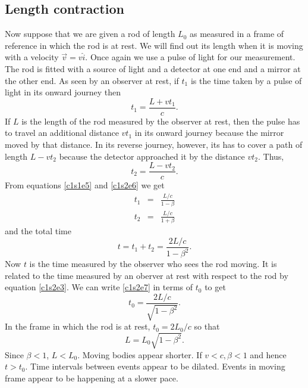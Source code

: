 \subsection{Length contraction}
Now suppose that we are given a rod of length $L_0$ as measured in a frame of
reference in which the rod is at rest. We will find out its length when it is
moving with a velocity $\vec{v} = v\hat{i}$. Once again we use a pulse of light
for our measurement. The rod is fitted with a source of light and a detector
at one end and a mirror at the other end. As seen by an observer at rest,
if $t_1$ is the time taken by a pulse of light in its onward journey then
\begin{equation}\label{c1s2e5}
t_1 = \frac{L + vt_1}{c}.
\end{equation}
If $L$ is the length of the rod measured by the observer at rest, then the pulse
has to travel an additional distance $vt_1$ in its onward journey because the
mirror moved by that distance. In its reverse journey, however, its has to
cover a path of length $L - vt_2$ because the detector approached it by the
distance $vt_2$. Thus,
\begin{equation}\label{c1s2e6}
t_2 = \frac{L - vt_2}{c}.
\end{equation}
From equations \eqref{c1s1e5} and \eqref{c1s2e6} we get
\begin{eqnarray*}
t_1 &=& \frac{L/c}{1 - \beta} \\
t_2 &=& \frac{L/c}{1 + \beta}
\end{eqnarray*}
and the total time 
\begin{equation}\label{c1s2e7}
t = t_1 + t_2 = \frac{2L/c}{1 - \beta^2}.
\end{equation}
Now $t$ is the time measured by the observer who sees the rod moving. It is 
related to the time measured by an oberver at rest with respect to the rod by
equation \eqref{c1s2e3}. We can write \eqref{c1s2e7} in terms of $t_0$ to get
\begin{equation}\label{c1s2e8}
t_0 = \frac{2L/c}{\sqrt{1 - \beta^2}}.
\end{equation}
In the frame in which the rod is at rest, $t_0 = 2L_0/c$ so that
\begin{equation}\label{c1s2e9}
L = L_0\sqrt{1 - \beta^2}.
\end{equation}
Since $\beta < 1$, $L < L_0$. Moving bodies appear shorter.
If $v < c, \beta < 1$ and hence $t > t_0$. Time intervals between events appear
to be dilated. Events in moving frame appear to be happening at a slower pace. 

